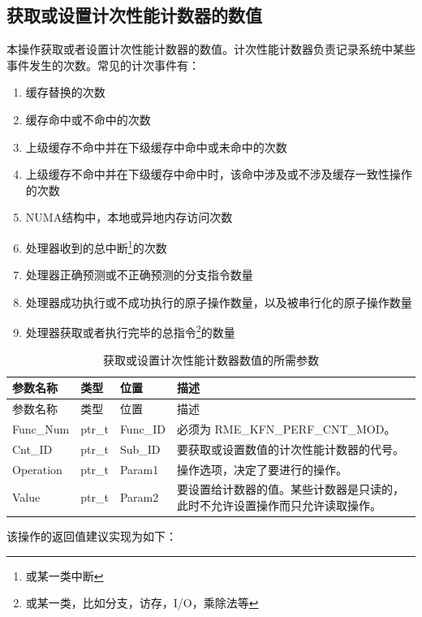 \subsection{获取或设置计次性能计数器的数值}\label{subsec:8-get-or-set-count-performance-counter}

本操作获取或者设置计次性能计数器的数值。计次性能计数器负责记录系统中某些事件发生的次数。常见的计次事件有：

\begin{enumerate}
\def\labelenumi{\arabic{enumi}.}
\item
  缓存替换的次数
\item
  缓存命中或不命中的次数
\item
  上级缓存不命中并在下级缓存中命中或未命中的次数
\item
  上级缓存不命中并在下级缓存中命中时，该命中涉及或不涉及缓存一致性操作的次数
\item
  NUMA结构中，本地或异地内存访问次数
\item
  处理器收到的总中断\footnote{或某一类中断}的次数
\item
  处理器正确预测或不正确预测的分支指令数量
\item
  处理器成功执行或不成功执行的原子操作数量，以及被串行化的原子操作数量
\item
  处理器获取或者执行完毕的总指令\footnote{或某一类，比如分支，访存，I/O，乘除法等}的数量
\end{enumerate}

\begin{xltabular}{\textwidth}{@{}>{\hsize\raggedright\arraybackslash}X>{\hsize\raggedright\arraybackslash}X>{\hsize\raggedright\arraybackslash}X>{\hsize\raggedright\arraybackslash}X@{}}
\caption{获取或设置计次性能计数器数值的所需参数}\label{tab:8-62-get-or-set-count-performance-counter-parameters}\\
\toprule
参数名称 & 类型 & 位置 & 描述\tabularnewline
\endfirsthead
\toprule
参数名称 & 类型 & 位置 & 描述\tabularnewline
\midrule
\endhead
\bottomrule
\endlastfoot
Func\_Num & ptr\_t & Func\_ID & 必须为 RME\_KFN\_PERF\_CNT\_MOD。\tabularnewline
Cnt\_ID & ptr\_t & Sub\_ID &
要获取或设置数值的计次性能计数器的代号。\tabularnewline
Operation & ptr\_t & Param1 &
操作选项，决定了要进行的操作。\tabularnewline
Value & ptr\_t & Param2 &
要设置给计数器的值。某些计数器是只读的，此时不允许设置操作而只允许读取操作。\tabularnewline
\end{xltabular}

该操作的返回值建议实现为如下：

